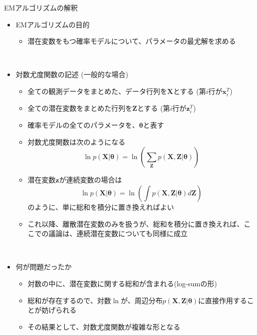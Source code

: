 \documentclass[dvipdfmx,notheorems,t]{beamer}
\begin{document}
\begin{frame}{EMアルゴリズムの解釈}

\begin{itemize}
	\item EMアルゴリズムの目的
	\begin{itemize}
		\item 潜在変数をもつ確率モデルについて、パラメータの最尤解を求める
	\end{itemize} \
	
	\item 対数尤度関数の記述 (一般的な場合)
	\begin{itemize}
		\item 全ての観測データをまとめた、データ行列を$\bm{X}$とする (第$i$行が$\bm{x}_i^T$)
		\item 全ての潜在変数をまとめた行列を$\bm{Z}$とする (第$i$行が$\bm{z}_i^T$)
		\item 確率モデルの全てのパラメータを、$\bm{\theta}$と表す
		\newline
		\item 対数尤度関数は次のようになる
		\begin{equation}
			\ln p(\bm{X} | \bm{\theta}) = \ln \left( \sum_{\bm{Z}} p(\bm{X}, \bm{Z} | \bm{\theta}) \right)
		\end{equation}
		
		\item 潜在変数$\bm{z}$が連続変数の場合は
		\begin{equation}
			\ln p(\bm{X} | \bm{\theta}) = \ln \left( \int p(\bm{X}, \bm{Z} | \bm{\theta}) d\bm{Z} \right)
		\end{equation}
		のように、単に総和を積分に置き換えればよい
		\newline
		\item これ以降、離散潜在変数のみを扱うが、総和を積分に置き換えれば、ここでの議論は、連続潜在変数についても同様に成立
	\end{itemize} \
	
	\item 何が問題だったか
	\begin{itemize}
		\item \alert{対数の中に、潜在変数に関する総和が含まれる}(\alert{log-sum}の形)
		\item 総和が存在するので、対数$\ln$が、周辺分布$p(\bm{X}, \bm{Z} | \bm{\theta})$に直接作用することが妨げられる
		\item その結果として、対数尤度関数が複雑な形となる
	\end{itemize} \
	

\end{itemize}
\end{frame}
\end{document}
